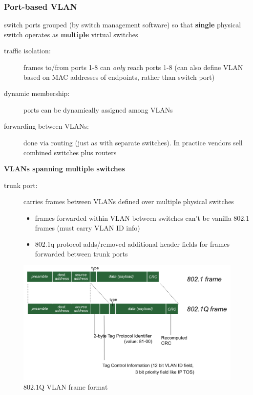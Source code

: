 \subsubsection{Port-based VLAN}
switch ports grouped (by switch management software) so that \textbf{single} physical switch operates as \textbf{multiple} virtual switches
\begin{description}
	\item[traffic isolation:] frames to/from ports 1-8 can \textit{only} reach ports 1-8 (can also define VLAN based on MAC addresses of endpoints, rather than switch port)
	\item[dynamic membership:] ports can be dynamically assigned among VLANs
	\item[forwarding between VLANs:] done via routing (just as with separate switches). In practice vendors sell combined switches plus routers
\end{description}
\textbf{VLANs spanning multiple switches}
\begin{description}
	\item[trunk port:] carries frames between VLANs defined over multiple physical switches
	\begin{itemize}
		\item frames forwarded within VLAN between switches can't be vanilla 802.1 frames (must carry VLAN ID info)
		\item 802.1q protocol adds/removed additional header fields for frames forwarded between trunk ports
	\end{itemize}
\end{description}
\begin{figure}[H]
	\includegraphics[width=\linewidth]{802q}
	\centering
	\caption{802.1Q VLAN frame format}
\end{figure}